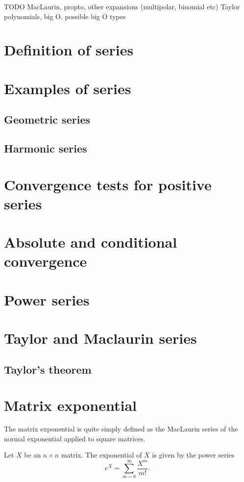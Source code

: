 TODO MacLaurin, propto, other expansions (multipolar, binomial etc) 
Taylor polynomials, big O, possible big O types

\section{Definition of series}
\section{Examples of series}
\subsection{Geometric series}
\subsection{Harmonic series}

\section{Convergence tests for positive series}

\section{Absolute and conditional convergence}

\section{Power series}

\section{Taylor and Maclaurin series}
\subsection{Taylor's theorem}


\section{Matrix exponential}
The matrix exponential is quite simply defined as the MacLaurin series of the normal exponential applied to square matrices.

\begin{definition}
Let $X$ be an $n\times n$ matrix. The exponential of $X$ is given by the power series
\[ e^X = \sum^\infty_{m=0} \frac{X^m}{m!}. \]
\end{definition}

